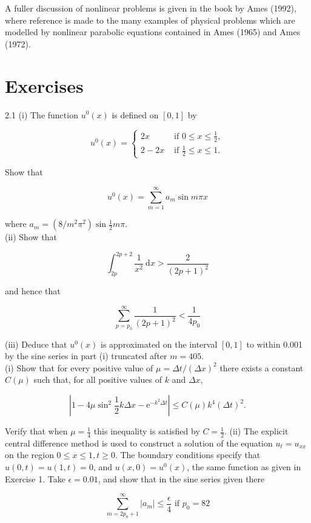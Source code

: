 \documentclass[10pt]{article}
\begin{document}
A fuller discussion of nonlinear problems is given in the book by Ames (1992), where reference is made to the many examples of physical problems which are modelled by nonlinear parabolic equations contained in Ames (1965) and Ames (1972).

\section*{Exercises}
2.1 (i) The function \(u^{0}(x)\) is defined on \([0,1]\) by

\[
u^{0}(x)= \begin{cases}2 x & \text { if } 0 \leq x \leq \frac{1}{2}, \\ 2-2 x & \text { if } \frac{1}{2} \leq x \leq 1 .\end{cases}
\]

Show that

\[
u^{0}(x)=\sum_{m=1}^{\infty} a_{m} \sin m \pi x
\]

where \(a_{m}=\left(8 / m^{2} \pi^{2}\right) \sin \frac{1}{2} m \pi\).\\
(ii) Show that

\[
\int_{2 p}^{2 p+2} \frac{1}{x^{2}} \mathrm{~d} x>\frac{2}{(2 p+1)^{2}}
\]

and hence that

\[
\sum_{p=p_{0}}^{\infty} \frac{1}{(2 p+1)^{2}}<\frac{1}{4 p_{0}}
\]

(iii) Deduce that \(u^{0}(x)\) is approximated on the interval \([0,1]\) to within 0.001 by the sine series in part (i) truncated after \(m=405\).\\
(i) Show that for every positive value of \(\mu=\Delta t /(\Delta x)^{2}\) there exists a constant \(C(\mu)\) such that, for all positive values of \(k\) and \(\Delta x\),

\[
\left|1-4 \mu \sin ^{2} \frac{1}{2} k \Delta x-\mathrm{e}^{-k^{2} \Delta t}\right| \leq C(\mu) k^{4}(\Delta t)^{2} .
\]

Verify that when \(\mu=\frac{1}{4}\) this inequality is satisfied by \(C=\frac{1}{2}\). (ii) The explicit central difference method is used to construct a solution of the equation \(u_{t}=u_{x x}\) on the region \(0 \leq x \leq 1, t \geq 0\). The boundary conditions specify that \(u(0, t)=u(1, t)=0\), and \(u(x, 0)=u^{0}(x)\), the same function as given in Exercise 1. Take \(\epsilon=0.01\), and show that in the sine series given there

\[
\sum_{m=2 p_{0}+1}^{\infty}\left|a_{m}\right| \leq \frac{\epsilon}{4} \text { if } p_{0}=82
\]
\end{document}
